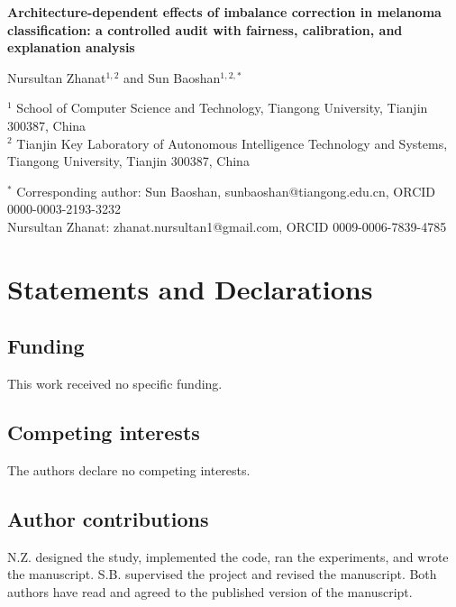 \documentclass[11pt]{article}
\begin{document}
\begin{center}
{\Large\bfseries Architecture-dependent effects of imbalance correction in melanoma classification: a controlled audit with fairness, calibration, and explanation analysis}

\vspace{1.2em}

{\large Nursultan Zhanat$^{1,2}$ and Sun Baoshan$^{1,2,*}$}

\vspace{0.8em}

{\small
$^{1}$ School of Computer Science and Technology, Tiangong University, Tianjin 300387, China\\
$^{2}$ Tianjin Key Laboratory of Autonomous Intelligence Technology and Systems, Tiangong University, Tianjin 300387, China
}

\vspace{0.8em}

{\small
$^{*}$ Corresponding author: Sun Baoshan, sunbaoshan@tiangong.edu.cn, ORCID 0000-0003-2193-3232\\
Nursultan Zhanat: zhanat.nursultan1@gmail.com, ORCID 0009-0006-7839-4785
}
\end{center}

\vspace{1.5em}

\section*{Statements and Declarations}

\subsection*{Funding}
This work received no specific funding.

\subsection*{Competing interests}
The authors declare no competing interests.

\subsection*{Author contributions}
N.Z. designed the study, implemented the code, ran the experiments, and wrote the manuscript. S.B. supervised the project and revised the manuscript. Both authors have read and agreed to the published version of the manuscript.
\end{document}
